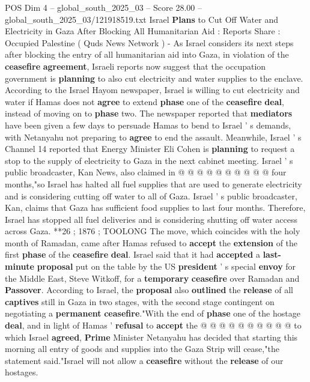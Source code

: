 \begin{textsample}{POS Dim 4 – global\_south\_2025\_03 – Score 28.00 – global\_south\_2025\_03/121918519.txt}  \label{ex:f4_pos_039}
Israel \textbf{Plans} to Cut Off Water and Electricity in Gaza After Blocking All Humanitarian Aid : Reports Share : Occupied Palestine ( Quds News Network ) - As Israel considers its next steps after blocking the entry of all humanitarian aid into Gaza, in violation of the \textbf{ceasefire} \textbf{agreement}, Israeli reports now suggest that the occupation government is \textbf{planning} to also cut electricity and water supplies to the enclave.
According to the Israel Hayom newspaper, Israel is willing to cut electricity and water if Hamas does not \textbf{agree} to extend \textbf{phase} one of the \textbf{ceasefire} \textbf{deal}, instead of moving on to \textbf{phase} two.
The newspaper reported that \textbf{mediators} have been given a few days to persuade Hamas to bend to Israel ' s demands, with Netanyahu not preparing to \textbf{agree} to end the assault.
Meanwhile, Israel ' s Channel 14 reported that Energy Minister Eli Cohen is \textbf{planning} to request a stop to the supply of electricity to Gaza in the next cabinet meeting.
Israel ' s public broadcaster, Kan News, also claimed in @ @ @ @ @ @ @ @ @ @ four months,"so Israel has halted all fuel supplies that are used to generate electricity and is considering cutting off water to all of Gaza.
Israel ' s public broadcaster, Kan, claims that Gaza has sufficient food supplies to last four months.
Therefore, Israel has stopped all fuel deliveries and is considering shutting off water access across Gaza. **26 ; 1876 ; TOOLONG The move, which coincides with the holy month of Ramadan, came after Hamas refused to \textbf{accept} the \textbf{extension} of the first \textbf{phase} of the \textbf{ceasefire} \textbf{deal}.
Israel said that it had \textbf{accepted} a \textbf{last-minute} \textbf{proposal} put on the table by the US \textbf{president} ' s special \textbf{envoy} for the Middle East, Steve Witkoff, for a \textbf{temporary} \textbf{ceasefire} over Ramadan and \textbf{Passover}.
According to Israel, the \textbf{proposal} also \textbf{outlined} the \textbf{release} of all \textbf{captives} still in Gaza in two stages, with the second stage contingent on negotiating a \textbf{permanent} \textbf{ceasefire}."With the end of \textbf{phase} one of the hostage \textbf{deal}, and in light of Hamas ' \textbf{refusal} to \textbf{accept} the @ @ @ @ @ @ @ @ @ @ to which Israel \textbf{agreed}, \textbf{Prime} Minister Netanyahu has decided that starting this morning all entry of goods and supplies into the Gaza Strip will cease,"the statement said."Israel will not allow a \textbf{ceasefire} without the \textbf{release} of our hostages.

\end{textsample}
